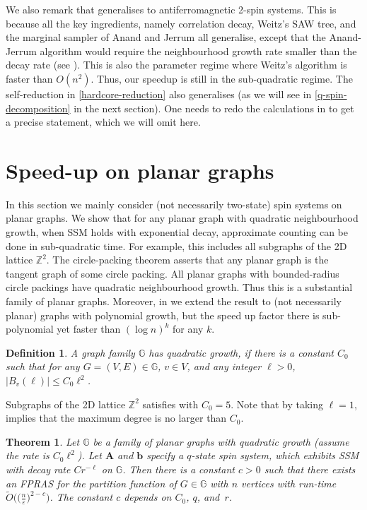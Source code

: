 \documentclass[10pt,a4paper]{article}
\newtheorem{theorem}{Theorem}[section]
\newtheorem{definition}{Definition}[section]
\def\=#1{\mathbb{#1}}
\newcommand{\abs}[1]{\ensuremath{\left\vert#1\right\vert}}
\newcommand{\eps}{\varepsilon}
\begin{document}
We also remark that  generalises to antiferromagnetic 2-spin systems.
This is because all the key ingredients, namely correlation decay, Weitz's SAW tree, and the marginal sampler of Anand and Jerrum all generalise,
except that the Anand-Jerrum algorithm would require the neighbourhood growth rate smaller than the decay rate (see ).
This is also the parameter regime where Weitz's algorithm is faster than $O(n^2)$.
Thus, our speedup is still in the sub-quadratic regime.
The self-reduction in \eqref{hardcore-reduction} also generalises (as we will see in \eqref{q-spin-decomposition} in the next section).
One needs to redo the calculations in  to get a precise statement, which we will omit here.

\section{Speed-up on planar graphs}
In this section we mainly consider (not necessarily two-state) spin systems on planar graphs.
We show that for any planar graph with quadratic neighbourhood growth,
when SSM holds with exponential decay,
approximate counting can be done in sub-quadratic time.
For example, this includes all subgraphs of the 2D lattice $\=Z^2$.
The circle-packing theorem asserts that any planar graph is the tangent graph of some circle packing.
All planar graphs with bounded-radius circle packings have quadratic neighbourhood growth.
Thus this is a substantial family of planar graphs.
Moreover, in  we extend the result to (not necessarily planar) graphs with polynomial growth,
but the speed up factor there is sub-polynomial yet faster than $(\log n)^k$ for any $k$.

\begin{definition}  \label{def:quadratic-growth}
  A graph family $\=G$ has \emph{quadratic growth},
  if there is a constant $C_0$ such that for any $G=(V,E)\in\=G$, $v\in V$, and any integer $\ell>0$,
  $\abs{B_v(\ell)}\le C_0\ell^2$.
\end{definition}

Subgraphs of the 2D lattice $\=Z^2$ satisfies  with $C_0=5$.
Note that by taking $\ell=1$,  implies that the maximum degree is no larger than $C_0$.

\begin{theorem}\label{lattice-counting}
  Let $\=G$ be a family of planar graphs with quadratic growth (assume the rate is $C_0\ell^2$).
  Let ${\mathbf{A}}$ and ${\mathbf{b}}$ specify a $q$-state spin system, which exhibits SSM with decay rate $Cr^{-\ell}$ on $\=G$.
  Then there is a constant $c>0$ such that there exists an FPRAS for the partition function of $G\in\=G$ with $n$ vertices with run-time $\widetilde{O}\big(\big(\frac{n}{\eps}\big)^{2-c}\big)$.
  The constant $c$ depends on $C_0$, $q$, and~$r$.
\end{theorem}
\end{document}
